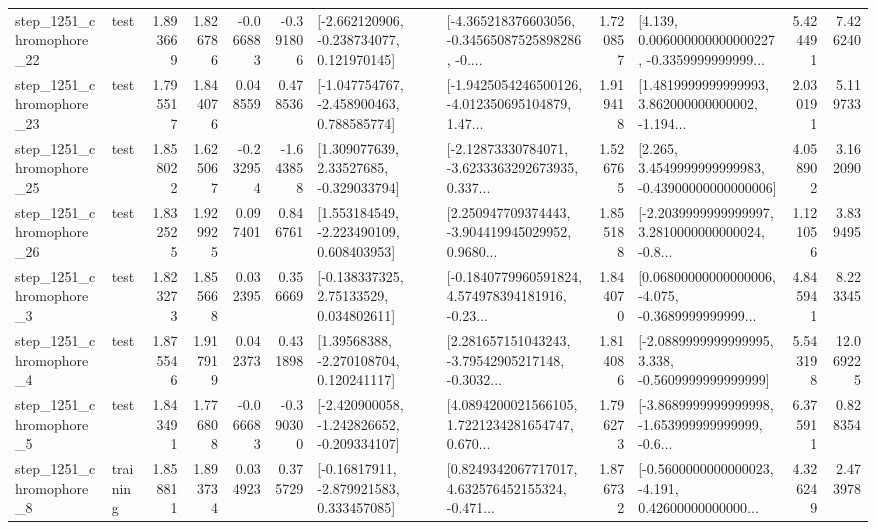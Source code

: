 \begin{tabular}{llrrrrllrlrr}
 step\_1251\_chromophore\_22 &      test &      1.893669 &    1.826786 &     -0.066883 & -0.391806 &   [-2.662120906, -0.238734077, 0.121970145] &  [-4.365218376603056, -0.34565087525898286, -0.... &       1.720857 &  [4.139, 0.006000000000000227, -0.3359999999999... &            5.424491 &          7.426240 \\
 step\_1251\_chromophore\_23 &      test &      1.795517 &    1.844076 &      0.048559 &  0.478536 &   [-1.047754767, -2.458900463, 0.788585774] &  [-1.9425054246500126, -4.012350695104879, 1.47... &       1.919418 &  [1.4819999999999993, 3.862000000000002, -1.194... &            2.030191 &          5.119733 \\
 step\_1251\_chromophore\_25 &      test &      1.858022 &    1.625067 &     -0.232954 & -1.643858 &     [1.309077639, 2.33527685, -0.329033794] &  [-2.12873330784071, -3.6233363292673935, 0.337... &       1.526765 &  [2.265, 3.4549999999999983, -0.43900000000000006] &            4.058902 &          3.162090 \\
 step\_1251\_chromophore\_26 &      test &      1.832525 &    1.929925 &      0.097401 &  0.846761 &    [1.553184549, -2.223490109, 0.608403953] &  [2.250947709374443, -3.904419945029952, 0.9680... &       1.855188 &  [-2.2039999999999997, 3.2810000000000024, -0.8... &            1.121056 &          3.839495 \\
  step\_1251\_chromophore\_3 &      test &      1.823273 &    1.855668 &      0.032395 &  0.356669 &     [-0.138337325, 2.75133529, 0.034802611] &  [-0.1840779960591824, 4.574978394181916, -0.23... &       1.844070 &  [0.06800000000000006, -4.075, -0.3689999999999... &            4.845941 &          8.223345 \\
  step\_1251\_chromophore\_4 &      test &      1.875546 &    1.917919 &      0.042373 &  0.431898 &     [1.39568388, -2.270108704, 0.120241117] &  [2.281657151043243, -3.79542905217148, -0.3032... &       1.814086 &  [-2.0889999999999995, 3.338, -0.5609999999999999] &            5.543198 &         12.069225 \\
  step\_1251\_chromophore\_5 &      test &      1.843491 &    1.776808 &     -0.066683 & -0.390300 &  [-2.420900058, -1.242826652, -0.209334107] &  [4.0894200021566105, 1.7221234281654747, 0.670... &       1.796273 &  [-3.8689999999999998, -1.653999999999999, -0.6... &            6.375911 &          0.828354 \\
  step\_1251\_chromophore\_8 &  training &      1.858811 &    1.893734 &      0.034923 &  0.375729 &    [-0.16817911, -2.879921583, 0.333457085] &  [0.8249342067717017, 4.632576452155324, -0.471... &       1.876732 &  [-0.5600000000000023, -4.191, 0.42600000000000... &            4.326249 &          2.473978 \\

\end{tabular}
